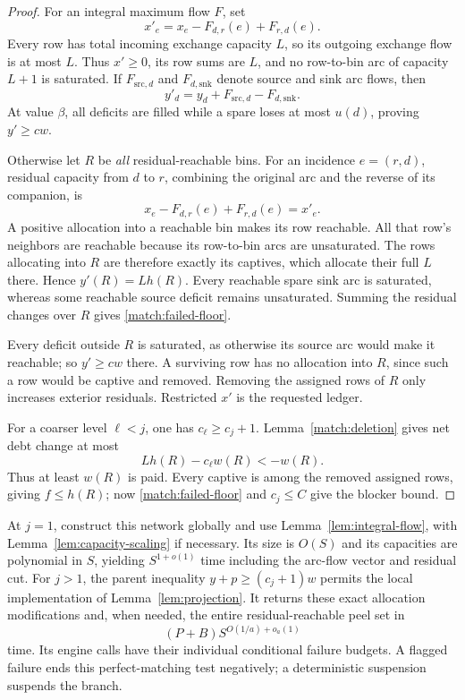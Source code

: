 \begin{proof}
For an integral maximum flow \(F\), set
\[
                   x'_e=x_e-F_{d,r}(e)+F_{r,d}(e).
\]
Every row has total incoming exchange capacity \(L\), so its
outgoing exchange flow is at most \(L\).  Thus \(x'\ge0\), its
row sums are \(L\), and no row-to-bin arc of capacity \(L+1\)
is saturated.  If \(F_{\mathrm{src},d}\) and
\(F_{d,\mathrm{snk}}\) denote source and sink arc flows, then
\[
                 y'_d=y_d+F_{\mathrm{src},d}-F_{d,\mathrm{snk}}.
\]
At value \(\beta\), all deficits are filled while a spare loses
at most \(u(d)\), proving \(y'\ge cw\).

Otherwise let \(R\) be \emph{all} residual-reachable bins.
For an incidence \(e=(r,d)\), residual capacity from \(d\) to \(r\),
combining the original arc and the reverse of its companion, is
\[
                       x_e-F_{d,r}(e)+F_{r,d}(e)=x'_e.
\]
A positive allocation into a reachable bin makes its row reachable.
All that row's neighbors are reachable because its row-to-bin arcs
are unsaturated.  The rows allocating into \(R\) are therefore
exactly its captives, which allocate their full \(L\) there.  Hence
\(y'(R)=Lh(R)\).  Every reachable spare sink arc is saturated,
whereas some reachable source deficit remains unsaturated.
Summing the residual changes over \(R\) gives
\eqref{match:failed-floor}.

Every deficit outside \(R\) is saturated, as otherwise its source
arc would make it reachable; so \(y'\ge cw\) there.  A surviving
row has no allocation into \(R\), since such a row would be captive
and removed.  Removing the assigned rows of \(R\) only increases
exterior residuals.  Restricted \(x'\) is the requested ledger.

For a coarser level \(\ell<j\), one has \(c_\ell\ge c_j+1\).
Lemma~\ref{match:deletion} gives net debt change at most
\[
                         Lh(R)-c_\ell w(R)<-w(R).
\]
Thus at least \(w(R)\) is paid.  Every captive is among the
removed assigned rows, giving \(f\le h(R)\); now
\eqref{match:failed-floor} and \(c_j\le C\) give the blocker bound.
\end{proof}

At \(j=1\), construct this network globally and use
Lemma~\ref{lem:integral-flow}, with
Lemma~\ref{lem:capacity-scaling} if necessary.  Its size is \(O(S)\)
and its capacities are polynomial in \(S\), yielding
\(S^{1+o(1)}\) time including the arc-flow vector and residual cut.
For \(j>1\), the parent inequality \(y+p\ge(c_j+1)w\)
permits the local implementation of Lemma~\ref{lem:projection}.
It returns these exact allocation modifications and, when needed,
the entire residual-reachable peel set in
\[
                            (P+B)S^{O(1/a)+o_a(1)}
\]
time.  Its engine calls have their individual conditional failure
budgets.  A flagged failure ends this perfect-matching test negatively;
a deterministic suspension suspends the branch.

